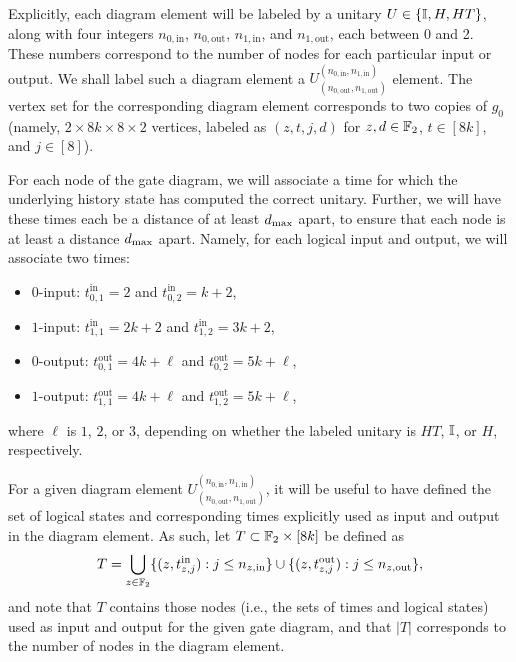 \documentclass[../thesis-main/thesis-main]{subfiles}
\begin{document}
Explicitly, each diagram element will be labeled by a unitary $U\in \{\mathbb{I}, H, HT\}$, along with four integers $n_{0,\text{in}}$, $n_{0,\text{out}}$, $n_{1,\text{in}}$, and $n_{1,\text{out}}$, each between 0 and 2.  These numbers correspond to the number of nodes for each particular input or output.  We shall label such a diagram element a $U^{(n_{0,\text{in}},n_{1,\text{in}})}_{(n_{0,\text{out}},n_{1,\text{out}})}$ element.  The vertex set for the corresponding diagram element corresponds to two copies of $g_0$ (namely, $2\times 8k \times 8 \times 2$ vertices, labeled as $(z,t,j,d)$ for $z,d\in \mathbb{F}_2$, $t\in [8k]$, and $j\in [8]$).  

For each node of the gate diagram, we will associate a time for which the underlying history state has computed the correct unitary.  Further, we will have these times each be a distance of at least $d_{\text{max}}$ apart, to ensure that each node is at least a distance $d_{\text{max}}$ apart.  Namely, for each logical input and output, we will associate two times:
\begin{itemize}
  \item $0$-input: $t_{0,1}^{\text{in}} = 2$ and $t_{0,2}^{\text{in}} = k+2$,
  \item $1$-input: $t_{1,1}^{\text{in}} = 2k+2$ and $t_{1,2}^{\text{in}} = 3k+2$,
  \item $0$-output: $t_{0,1}^{\text{out}} = 4k+\ell$ and $t_{0,2}^{\text{out}} = 5k+\ell$,
  \item $1$-output: $t_{1,1}^{\text{out}} = 4k+\ell$ and $t_{1,2}^{\text{out}} = 5k+\ell$,
\end{itemize}
where $\ell$ is $1$, $2$, or $3$, depending on whether the labeled unitary is $HT$, $\mathbb{I}$, or $H$, respectively.

For a given diagram element $U^{(n_{0,\text{in}},n_{1,\text{in}})}_{(n_{0,\text{out}},n_{1,\text{out}})}$, it will be useful to have defined the set of logical states and corresponding times explicitly used as input and output in the diagram element.  As such, let $T\subset \mathbb{F}_2 \times [8k]$ be defined as
\begin{equation}
  T =\bigcup_{z\in \mathbb{F}_2} \{(z, t_{z,j}^{\text{in}} ): j \leq n_{z,\text{in}}\} \cup \{(z, t_{z,j}^{\text{out}}) : j \leq n_{z,\text{out}}\},
\end{equation}
and note that $T$ contains those nodes (i.e., the sets of times and logical states) used as input and output for the given gate diagram, and that $|T|$ corresponds to the number of nodes in the diagram element.
\end{document}
